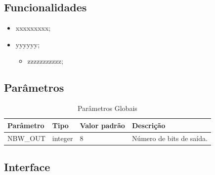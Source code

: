 \documentclass[a4paper]{article}
\begin{document}
\subsection{Funcionalidades}

\begin{itemize}
    \item xxxxxxxxx;
    \item yyyyyy;
    \begin{itemize}
        \item zzzzzzzzzzz;
    \end{itemize}
\end{itemize}

\subsection{Parâmetros}

\begin{longtable}{|l|l|l|l|}
\caption{Parâmetros Globais} \\
\hline
\rowcolor[HTML]{27378F} 
{\color[HTML]{FFFFFF} Parâmetro} & {\color[HTML]{FFFFFF} Tipo} & {\color[HTML]{FFFFFF} Valor padrão} & {\color[HTML]{FFFFFF} Descrição}                                                                                        \\ \hline
NBW\_OUT                         & integer                     & 8                                   & Número de bits de saída.                                                                                       \\ \hline
\end{longtable}

\subsection{Interface}
\end{document}
